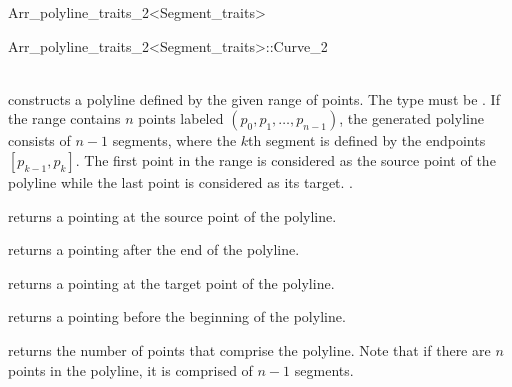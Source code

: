 \begin{ccRefClass}{Arr_polyline_traits_2<Segment_traits>}
\begin{ccClass}{Arr_polyline_traits_2<Segment_traits>::Curve_2}

\ccTypes


    \ccCreation

     \\
  {constructs a polyline defined by the given range of points.
   The  type must be .
   If the range contains $n$ points labeled $(p_{0},p_{1},\ldots,p_{n-1})$,
   the generated polyline consists of $n-1$ segments, where the $k$th segment 
   is defined by the endpoints $[p_{k-1},p_{k}]$. The first point in the 
   range is considered as the source point of the polyline while the last 
   point is considered as its target.
   .}

\ccOperations

  {returns a  pointing at the source point of the 
   polyline.}

  {returns a  pointing after the end of the polyline.}

  {returns a  pointing at the target point of the 
   polyline.}

  {returns a  pointing before the beginning of the 
   polyline.}

  {returns the number of points that comprise the polyline. Note that if there
   are $n$ points in the polyline, it is comprised of $n-1$ segments.}

\end{ccClass}

\end{ccRefClass}


\ccRefPageEnd
